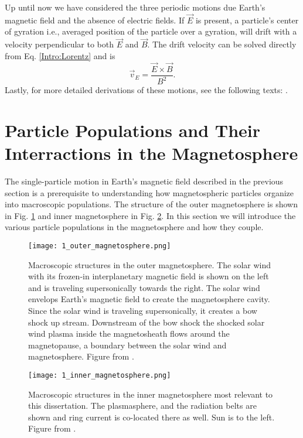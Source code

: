 Up until now we have considered the three periodic motions due Earth's magnetic field and the absence of electric fields. If $\vec{E}$ is present, a particle's center of gyration i.e., averaged position of the particle over a gyration, will drift with a velocity perpendicular to both $\vec{E}$ and $\vec{B}$. The drift velocity can be solved directly from Eq. \ref{Intro:Lorentz} and is
\begin{equation}
\vec{v}_E = \frac{\vec{E} \times \vec{B}}{B^2}.
\end{equation} Lastly, for more detailed derivations of these motions, see the following texts: \citet{Baumjohann1997, Schulz1974, Tsurutani1997}.
        
\section{Particle Populations and Their Interractions in the Magnetosphere}\label{ntro:particle_populations}
The single-particle motion in Earth's magnetic field described in the previous section is a prerequisite to understanding how magnetospheric  particles organize into macroscopic populations. The structure of the outer magnetosphere is shown in Fig. \ref{Intro:outer_magnetosphere} and inner magnetosphere in Fig. \ref{Intro:inner_magnetosphere}. In this section we will introduce the various particle populations in the magnetosphere and how they couple.

\begin{figure}
\texttt{[image: 1\_outer\_magnetosphere.png]}
\caption{Macroscopic structures in the outer magnetosphere. The solar wind with its frozen-in interplanetary magnetic field is shown on the left and is traveling supersonically towards the right. The solar wind envelops Earth's magnetic field to create the magnetosphere cavity. Since the solar wind is traveling supersonically, it creates a bow shock up stream. Downstream of the bow shock the shocked solar wind plasma inside the magnetosheath flows around the magnetopause, a boundary between the solar wind and magnetosphere. Figure from \citet{Baumjohann1997}.}
\label{Intro:outer_magnetosphere}
\end{figure}

\begin{figure}
\texttt{[image: 1\_inner\_magnetosphere.png]}
\caption{Macroscopic structures in the inner magnetosphere most relevant to this dissertation. The plasmasphere, and the radiation belts are shown and ring current is co-located there as well. Sun is to the left. Figure from \citet{Baumjohann1997}.}
\label{Intro:inner_magnetosphere}
\end{figure}

